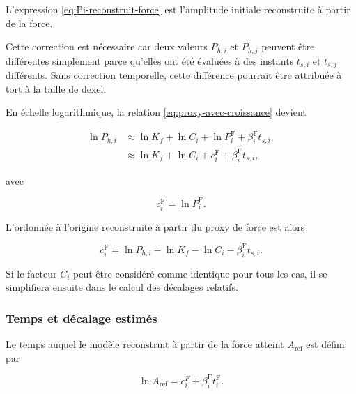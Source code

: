 \documentclass[
    11pt,
    a4paper
]{article}
\begin{document}
L'expression \eqref{eq:Pi-reconstruit-force} est l’amplitude initiale reconstruite à partir de la force.


Cette correction est nécessaire car deux valeurs \(P_{h,i}\) et \(P_{h,j}\)
peuvent être différentes simplement parce qu’elles ont été évaluées à des
instants \(t_{s,i}\) et \(t_{s,j}\) différents. Sans correction temporelle,
cette différence pourrait être attribuée à tort à la taille de dexel.

En échelle logarithmique, la relation
\ref{eq:proxy-avec-croissance} devient

\begin{align}
    \ln P_{h,i}
    &\approx
    \ln K_f
    +
    \ln C_i
    +
    \ln P_i^{\mathrm{F}}
    +
    \beta_i^{\mathrm{F}} t_{s,i},
    \nonumber\\
    &\approx
    \ln K_f
    +
    \ln C_i
    +
    c_i^{\mathrm{F}}
    +
    \beta_i^{\mathrm{F}} t_{s,i},
    \label{eq:log-proxy-correction-temporelle}
\end{align}

avec

\begin{equation}
    c_i^{\mathrm{F}}=\ln P_i^{\mathrm{F}}.
\end{equation}

L’ordonnée à l’origine reconstruite à partir du proxy de force est alors

\begin{equation}
    c_i^{\mathrm{F}}
    =
    \ln P_{h,i}
    -
    \ln K_f
    -
    \ln C_i
    -
    \beta_i^{\mathrm{F}} t_{s,i}.
    \label{eq:ci-force-corrige}
\end{equation}

Si le facteur \(C_i\) peut être considéré comme identique pour tous les cas,
il se simplifiera ensuite dans le calcul des décalages relatifs.




\subsubsection{Temps et décalage estimés}

Le temps auquel le modèle reconstruit à partir de la force atteint
\(A_{\mathrm{ref}}\) est défini par

\begin{equation}
    \ln A_{\mathrm{ref}}
    =
    c_i^{F}
    +
    \beta_i^{\mathrm{F}} t_i^{\mathrm{F}}.
    \label{eq:condition-force-Aref}
\end{equation}
\end{document}
